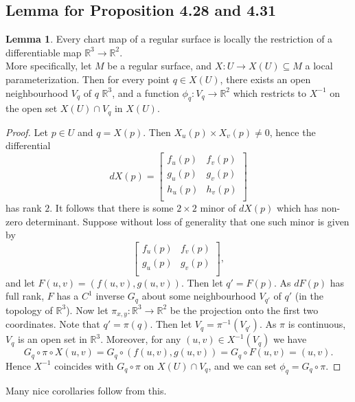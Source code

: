 \documentclass{article}
\theoremstyle{definition}
\newtheorem{lemma}[theorem]{Lemma}
\newcommand{\R}{\mathbb{R}}
\begin{document}
\subsection*{Lemma for Proposition 4.28 and 4.31}

\begin{lemma}
	Every chart map of a regular surface is locally the restriction
	of a differentiable map $\R^3 \to \R^2$. \\

	More specifically, let $M$ be a regular surface, and $X : U \to X(U)
	\subseteq M$ a local parameterization. Then for every point $q \in X(U)$,
	there exists an open neighbourhood $V_q$ of $q$ $\R^3$, and a function
	$\phi_q : V_q \to \R^2$ which restricts to $X^{-1}$ on the open set $X(U)
	\cap V_q$ in $X(U)$.
\end{lemma}
\begin{proof}
	Let $p \in U$ and $q = X(p)$. Then $X_u(p) \times X_v(p) \not = 0$,
	hence the differential 	
	\[
		dX(p)
		=
		\begin{bmatrix}
			f_u(p) & f_v(p) \\
			g_u(p) & g_v(p) \\
			h_u(p) & h_v(p) \\
		\end{bmatrix}
	\] 
	has rank $2$. It follows that there is some $2 \times 2$ minor of $dX(p)$
	which has non-zero determinant. Suppose without loss of generality that one
	such minor is given by
	\[
		\begin{bmatrix}
			f_u(p) & f_v(p) \\
			g_u(p) & g_v(p) \\
		\end{bmatrix},
	\]
	and let $F(u, v) = (f(u, v), g(u, v))$. Then let $q' = F(p)$. As $dF(p)$
	has full rank, $F$ has a $C^{1}$ inverse $G_q$ about some neighbourhood
	$V_{q'}$ of $q'$ (in the topology of $\R^3$). Now let $\pi_{x, y} : \R^{3}
	\to \R^{2}$ be the projection onto the first two coordinates. Note that $q'
	= \pi(q)$. Then let $V_q = \pi^{-1}(V_{q'})$. As $\pi$ is continuous, $V_q$
	is an open set in $\R^3$. Moreover, for any $(u, v) \in X^{-1}(V_q)$ we
	have
	\[
		G_q \circ \pi \circ X(u, v)
		=
		G_q \circ (f(u, v), g(u, v))
		=
		G_q \circ F(u, v)
		=
		(u, v).
	\] 
	Hence $X^{-1}$ coincides with $G_q \circ \pi$ on $X(U) \cap V_q$,
	and we can set $\phi_q = G_q \circ \pi$.
\end{proof}

Many nice corollaries follow from this.
\end{document}

